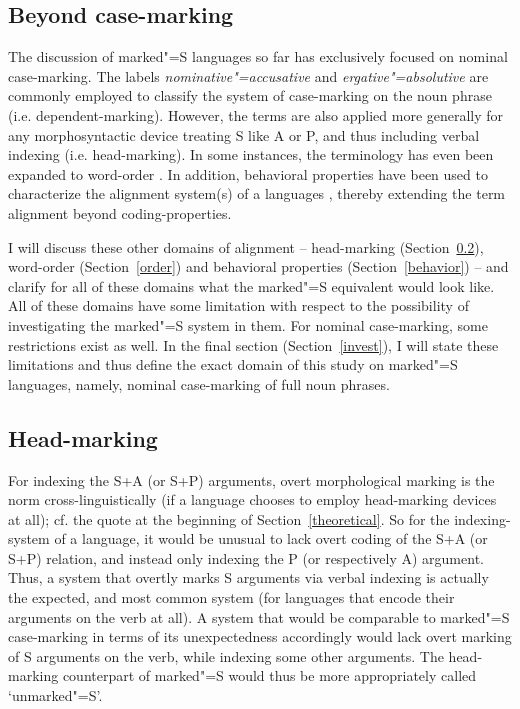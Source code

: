\subsection{Beyond case-marking}
The discussion of marked"=S languages so far has exclusively focused on nominal case-marking.
The labels \textit{nominative"=accusative} and \textit{ergative"=absolutive} are commonly employed to classify the system of case-marking on the noun phrase (i.e. de\-pen\-dent-marking). 
However, the terms are also applied more generally for any morphosyntactic device treating S like A or P, and thus including verbal indexing (i.e. head-marking). 
In some instances, the terminology has even been expanded to word-order \citep{Buth:1981, Andersen:1988}. %
In addition, behavioral properties have been used to characterize the alignment system(s) of a languages \citep{Bickel.align}, thereby extending the term alignment beyond coding-properties.

I will discuss these other domains of alignment -- head-marking (Section~\ref{head}), word-order (Section~\ref{order}) and behavioral properties (Section~\ref{behavior}) -- and clarify for all of these domains what the marked"=S equivalent would look like. 
All of these domains have some limitation with respect to the possibility of investigating the marked"=S system in them. 
For nominal case-marking, some restrictions exist as well. 
In the final section (Section~\ref{invest}), I will state these limitations and thus define the exact domain of this study on marked"=S languages, namely, nominal case-marking of full noun phrases.

\subsection{Head-marking}\label{head}

For indexing the S+A (or S+P) arguments, overt morphological marking is the norm cross-linguistically (if a language chooses to employ head-marking devices at all); cf. the \citet{Chomsky:1993} quote at the beginning of Section~\ref{theoretical}.
So for the indexing-system of a language, it would be unusual to lack overt coding of the S+A (or S+P) relation, and instead only indexing the P (or respectively A) argument.
Thus, a system that overtly marks S arguments via verbal indexing is actually the expected, and most common system (for languages that encode their arguments on the verb at all). 
A system that would be comparable to marked"=S case-marking in terms of its unexpectedness accordingly would lack overt marking of S arguments on the verb, while indexing some other arguments. 
The head-marking counterpart of marked"=S would thus be more appropriately called `unmarked"=S'.    

